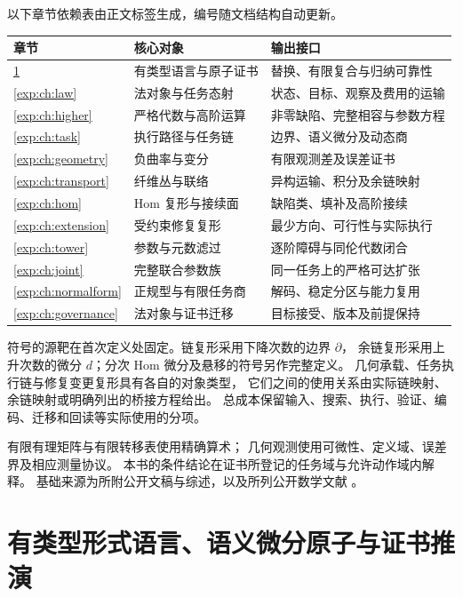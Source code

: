 \documentclass[12pt,a4paper,openany,notitlepage]{report}
\theoremstyle{plain}
\theoremstyle{definition}
\theoremstyle{remark}
\begin{document}
\begin{CJK*}{UTF8}{gkai}
以下章节依赖表由正文标签生成，编号随文档结构自动更新。
\begin{center}\small
\begin{tabularx}{\textwidth}{P{.13\textwidth}P{.32\textwidth}Y}
\toprule
章节 & 核心对象 & 输出接口\\
\midrule
\ref{exp:ch:logic} & 有类型语言与原子证书 & 替换、有限复合与归纳可靠性\\
\ref{exp:ch:law} & 法对象与任务态射 & 状态、目标、观察及费用的运输\\
\ref{exp:ch:higher} & 严格代数与高阶运算 & 非零缺陷、完整相容与参数方程\\
\ref{exp:ch:task} & 执行路径与任务链 & 边界、语义微分及动态商\\
\ref{exp:ch:geometry} & 负曲率与变分 & 有限观测差及误差证书\\
\ref{exp:ch:transport} & 纤维丛与联络 & 异构运输、积分及余链映射\\
\ref{exp:ch:hom} & Hom 复形与接续面 & 缺陷类、填补及高阶接续\\
\ref{exp:ch:extension} & 受约束修复复形 & 最少方向、可行性与实际执行\\
\ref{exp:ch:tower} & 参数与元数滤过 & 逐阶障碍与同伦代数闭合\\
\ref{exp:ch:joint} & 完整联合参数族 & 同一任务上的严格可达扩张\\
\ref{exp:ch:normalform} & 正规型与有限任务商 & 解码、稳定分区与能力复用\\
\ref{exp:ch:governance} & 法对象与证书迁移 & 目标接受、版本及前提保持\\
\bottomrule
\end{tabularx}
\end{center}

符号的源靶在首次定义处固定。链复形采用下降次数的边界 $\partial$，
余链复形采用上升次数的微分 $d$；分次 Hom 微分及悬移的符号另作完整定义。
几何承载、任务执行链与修复变更复形具有各自的对象类型，
它们之间的使用关系由实际链映射、余链映射或明确列出的桥接方程给出。
总成本保留输入、搜索、执行、验证、编码、迁移和回读等实际使用的分项。

有限有理矩阵与有限转移表使用精确算术；
几何观测使用可微性、定义域、误差界及相应测量协议。
本书的条件结论在证书所登记的任务域与允许动作域内解释。
基础来源为所附公开文稿与综述，以及所列公开数学文献
\cite{S01,S10,S19,S38,GFrameworkSynthesis,ExtHatcher,ExtWeibel,ExtLadaMarkl,ExtLeeRiemann,ExtKobayashiNomizu,ExtBottTu}。
\clearpage
{}
\chapter{有类型形式语言、语义微分原子与证书推演}
\label{exp:ch:logic}


\end{CJK*}
\end{document}
